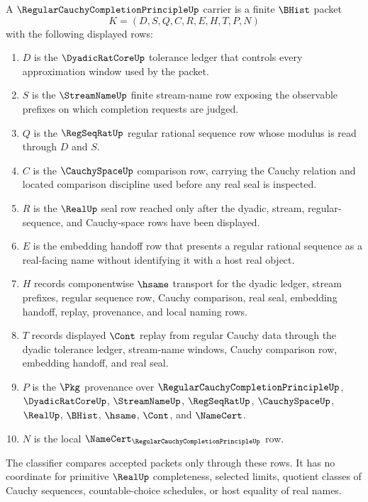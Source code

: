 \begin{definition}
\label{def:regular-cauchy-completion-principle-carrier}
A $\RegularCauchyCompletionPrincipleUp$ carrier is a finite $\BHist$ packet
$$
K=(D,S,Q,C,R,E,H,T,P,N)
$$
with the following displayed rows:
\begin{enumerate}
\item $D$ is the $\DyadicRatCoreUp$ tolerance ledger that controls every approximation window used by the packet.
\item $S$ is the $\StreamNameUp$ finite stream-name row exposing the observable prefixes on which completion requests are judged.
\item $Q$ is the $\RegSeqRatUp$ regular rational sequence row whose modulus is read through $D$ and $S$.
\item $C$ is the $\CauchySpaceUp$ comparison row, carrying the Cauchy relation and located comparison discipline used before any real seal is inspected.
\item $R$ is the $\RealUp$ seal row reached only after the dyadic, stream, regular-sequence, and Cauchy-space rows have been displayed.
\item $E$ is the embedding handoff row that presents a regular rational sequence as a real-facing name without identifying it with a host real object.
\item $H$ records componentwise $\hsame$ transport for the dyadic ledger, stream prefixes, regular sequence row, Cauchy comparison, real seal, embedding handoff, replay, provenance, and local naming rows.
\item $T$ records displayed $\Cont$ replay from regular Cauchy data through the dyadic tolerance ledger, stream-name windows, Cauchy comparison row, embedding handoff, and real seal.
\item $P$ is the $\Pkg$ provenance over $\RegularCauchyCompletionPrincipleUp$, $\DyadicRatCoreUp$, $\StreamNameUp$, $\RegSeqRatUp$, $\CauchySpaceUp$, $\RealUp$, $\BHist$, $\hsame$, $\Cont$, and $\NameCert$.
\item $N$ is the local $\NameCert_{\RegularCauchyCompletionPrincipleUp}$ row.
\end{enumerate}
The classifier compares accepted packets only through these rows. It has no coordinate for primitive $\RealUp$ completeness, selected limits, quotient classes of Cauchy sequences, countable-choice schedules, or host equality of real names.
\end{definition}

